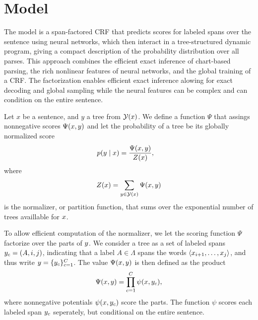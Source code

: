 \section{Model}
   The model is a span-factored CRF that predicts scores for labeled spans over the sentence using neural networks, which then interact in a tree-structured dynamic program, giving a compact description of the probability distribution over all parses. This approach combines the efficient exact inference of chart-based parsing, the rich nonlinear features of neural networks, and the global training of a CRF. The factorization enables efficient exact inference alowing for exact decoding and global sampling while the neural features can be complex and can condition on the entire sentence.

    Let $x$ be a sentence, and $y$ a tree from $\mathcal{Y}(x)$. We define a function $\Psi$ that assings nonnegative scores $\Psi(x, y)$ and let the probability of a tree be its globally normalized score
    \begin{align}
      \label{eq:crf-model}
      p(y \mid x) &= \frac{\Psi(x, y)}{Z(x)},
    \end{align}
    where
    \begin{align*}
      Z(x) = \sum_{ y \in \mathcal{Y}(x) } \Psi(x, y)
    \end{align*}
    is the normalizer, or partition function, that sums over the exponential number of trees availlable for $x$.

    To allow efficient computation of the normalizer, we let the scoring function $\Psi$ factorize over the parts of $y$. We consider a tree as a set of labeled spans $y_c = (A, i, j)$, indicating that a label $A \in \Lambda$ spans the words $\langle x_{i+1}, \dots, x_j \rangle$, and thus write $y = \{ y_c \}_{c=1}^C$. The value $\Psi(x, y)$ is then defined as the product
    \begin{align}
      \Psi(x, y) = \prod_{c=1}^C \psi(x, y_c),
    \end{align}
    where nonnegative potentials $\psi(x, y_c)$ score the parts. The function $\psi$ scores each labeled span $y_c$ seperately, but conditional on the entire sentence.

